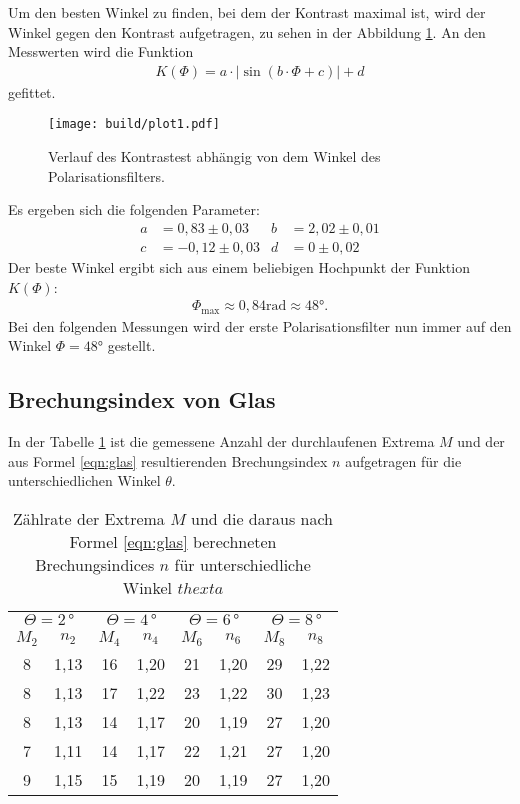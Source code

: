 Um den besten Winkel zu finden, bei dem der Kontrast maximal ist, wird
der Winkel gegen den Kontrast aufgetragen, zu sehen in der Abbildung \ref{fig:kontrast}.
An den Messwerten wird die Funktion
\begin{align}
  K\left(\Phi\right) = a \cdot \left| \sin\left(b\cdot\Phi+c \right)\right| + d
\end{align}
gefittet.

\begin{figure}
    \centering
    \texttt{[image: build/plot1.pdf]}
    \caption{Verlauf des Kontrastest abhängig von dem Winkel des Polarisationsfilters.}
    \label{fig:kontrast}
\end{figure}

Es ergeben sich die folgenden Parameter:
\begin{align*}
  a&=0,83\pm0,03
  &b&=2,02\pm0,01\\
  c&=-0,12\pm0,03
  &d&=0\pm0,02
\end{align*}
Der beste Winkel ergibt sich aus einem beliebigen
Hochpunkt der Funktion $K(\Phi)$:
\begin{align*}
 \Phi_\mathrm{max}\approx0,84\si{\radian}\approx48\si{\degree}.
\end{align*}
Bei den folgenden Messungen wird der erste Polarisationsfilter
nun immer auf den Winkel $\Phi=48\si{\degree}$ gestellt.


\subsection{Brechungsindex von Glas}
In der Tabelle \ref{tab:glas} ist die gemessene Anzahl der durchlaufenen Extrema $M$
und der aus Formel \eqref{eqn:glas} resultierenden Brechungsindex $n$ aufgetragen
für die unterschiedlichen Winkel $\theta$.

\begin{table}
  \caption{Zählrate der Extrema $M$ und die daraus nach Formel \eqref{eqn:glas} berechneten Brechungsindices $n$ für unterschiedliche Winkel $thexta$}
  \label{tab:glas}
  \begin{tabular}{c c | c c | c c | c c}
    \toprule
\multicolumn{2}{c}{$\Theta=2\,\si{\degree}$}  &  \multicolumn{2}{c}{$\Theta=4\,\si{\degree}$} & \multicolumn{2}{c}{$\Theta=6\,\si{\degree}$} & \multicolumn{2}{c}{$\Theta=8\,\si{\degree}$}\\
      $M_2$ &  $n_2$ &  $M_4$ & $n_4$ & $M_6$ &  $n_6$ & $M_8$ & $n_8$ \\
  \midrule
       8 &  1,13 &  16 &  1,20 & 21 & 1,20 & 29 & 1,22\\
       8 &  1,13 &  17 &  1,22 & 23 & 1,22 & 30 & 1,23\\
       8 &  1,13 &  14 &  1,17 & 20 & 1,19 & 27 & 1,20\\
       7 &  1,11 &  14 &  1,17 & 22 & 1,21 & 27 & 1,20\\
       9 &  1,15 &  15 &  1,19 & 20 & 1,19 & 27 & 1,20\\
  \bottomrule
  \end{tabular}
\end{table}

